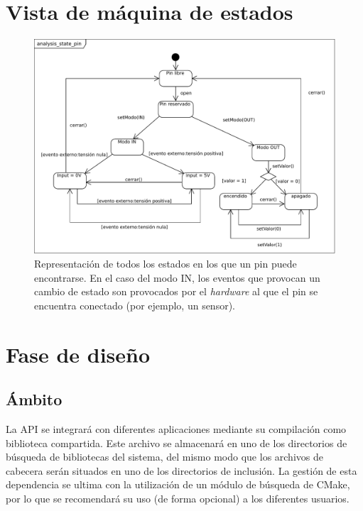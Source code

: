\documentclass[letterpaper,10pt,spanish]{sphinxmanual}
\begin{document}
\chapter{Vista de máquina de estados}
\label{analysis/states::doc}\label{analysis/states:vista-de-maquina-de-estados}\begin{figure}[htbp]
\centering
\capstart

\includegraphics{analysis_state_pin.pdf}
\caption{Representación de todos los estados en los que un pin puede encontrarse. En el caso del modo IN, los eventos que provocan un cambio de estado son provocados por el \emph{hardware} al que el pin se encuentra conectado (por ejemplo, un sensor).}\end{figure}


\chapter{Fase de diseño}
\label{design/intro:fase-de-diseno}\label{design/intro::doc}

\section{Ámbito}
\label{design/scope:ambito}\label{design/scope::doc}
La API se integrará con diferentes aplicaciones mediante su compilación como biblioteca compartida. Este archivo se almacenará en uno de los directorios de búsqueda de bibliotecas del sistema, del mismo modo que los archivos de cabecera serán situados en uno de los directorios de inclusión. La gestión de esta dependencia se ultima con la utilización de un módulo de búsqueda de CMake, por lo que se recomendará su uso (de forma opcional) a los diferentes usuarios.
\end{document}
